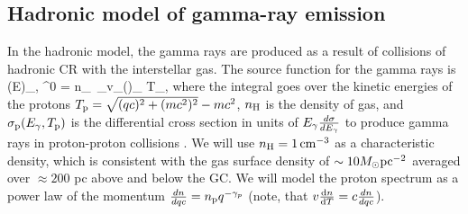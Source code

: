 

\subsection{Hadronic model of gamma-ray emission}
\label{sec:Pion_model}

In the hadronic model, the gamma rays are produced as a result of collisions of hadronic CR with the interstellar gas.
The source function for the gamma rays is 
\be
\left(E\right)_{\!\!\gamma, \pi^0}\! = \int n_\Hy\ \sigma_\pr v_\pr \left(\right)_{\!\!\pr} \de T_\pr,
\label{eq:had_spectrum}
\ee
where the integral goes over the kinetic energies of the protons $T_{\text{p}} = \sqrt{(qc)^2 + (mc^2)^2} - mc^2$,
$n_{\text{H}}$ is the density of gas, and $\sigma_{\text{p}} (E_\gamma, T_{\text{p}})$ is 
the differential cross section in units of $E_\gamma\frac{d\sigma}{d E_\gamma}$
to produce gamma rays in proton-proton collisions \citep{2006ApJ...647..692K, 2008ApJ...674..278K}.
We will use $n_{\text{H}} = \SI{1}{cm^{-3}}$ as a characteristic density,
which is consistent with the gas surface density of $\sim 10 M_\odot {\rm pc}^{-2}$ \citep{2017ApJ...834...57M}
averaged over $\approx 200$ pc above and below the GC.
We will model the proton spectrum as a power law of the momentum $\frac{d n}{d qc} = n_{\text{p}} q^{-\gamma_p}$ 
(note, that $ v \frac{\text{d} n}{\text{d} T} = c \frac{d n}{d qc}$).


